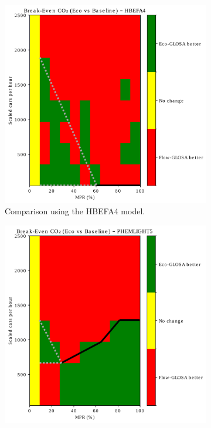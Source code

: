 \begin{figure}[htb]
  \centering
  \begin{subfigure}[b]{0.45\textwidth}
    \includegraphics[width=\textwidth]{data/img/BreakEven/BreakEven_CO2_HBEFA4.pdf}
    \caption{Comparison using the HBEFA4 model.}
    \label{fig:BE_EcoFlow_HBEFA4}
  \end{subfigure}\hfill
  \begin{subfigure}[b]{0.45\textwidth}
    \includegraphics[width=\textwidth]{data/img/BreakEven/BreakEven_CO2_PHEMLIGHT5.pdf}

\end{subfigure}
\end{figure}
